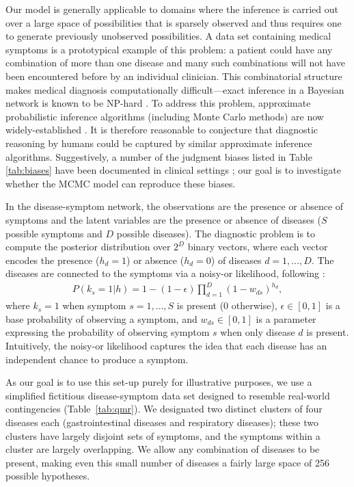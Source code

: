 Our model is generally applicable to domains where the inference is carried out over a large space of possibilities that is sparsely observed and thus requires one to generate previously unobserved possibilities. A data set containing medical symptoms is a prototypical example of this problem: a patient could have any combination of more than one disease and many such combinations will not have been encountered before by an individual clinician. This combinatorial structure makes medical diagnosis computationally difficult---exact inference in a Bayesian network is known to be NP-hard \citep{cooper1990complexity}. To address this problem, approximate probabilistic inference algorithms (including Monte Carlo methods) are now widely-established \citep[e.g.,][]{Shwe1991, Jaakkola1999, Heckerman1990}. It is therefore reasonable to conjecture that diagnostic reasoning by humans could be captured by similar approximate inference algorithms. Suggestively, a number of the judgment biases listed in Table \ref{tab:biases} have been documented in clinical settings \citep{redelmeier1995probability,elstein1978medical,weber1993}; our goal is to investigate whether the MCMC model can reproduce these biases.

In the disease-symptom network, the observations are the presence or absence of symptoms and the latent variables are the presence or absence of diseases ($S$ possible symptoms and $D$ possible diseases). The diagnostic problem is to compute the posterior distribution over $2^D$ binary vectors, where each vector encodes the presence ($h_d=1$) or absence ($h_d=0$) of diseases $d = 1,\ldots,D$. The diseases are connected to the symptoms via a noisy-or likelihood, following \cite{shwe1991probabilistic}:
\begin{align}
P(k_s = 1|h) = 1 - (1-\epsilon) \prod_{d=1}^D (1-w_{ds})^{h_d},
\end{align}
where $k_s = 1$ when symptom $s = 1, \ldots, S$ is present (0 otherwise), $\epsilon \in [0,1]$ is a base probability of observing a symptom, and $w_{ds} \in [0,1]$ is a parameter expressing the probability of observing symptom $s$ when only disease $d$ is present. Intuitively, the noisy-or likelihood captures the idea that each disease has an independent chance to produce a symptom.

As our goal is to use this set-up purely for illustrative purposes, we use a simplified fictitious disease-symptom data set designed to resemble real-world contingencies (Table~\ref{tab:qmr}). We designated two distinct clusters of four diseases each (gastrointestinal diseases and respiratory diseases); these two clusters have largely disjoint sets of symptoms, and the symptoms within a cluster are largely overlapping. We allow any combination of diseases to be present, making even this small number of diseases a fairly large space of 256 possible hypotheses.

